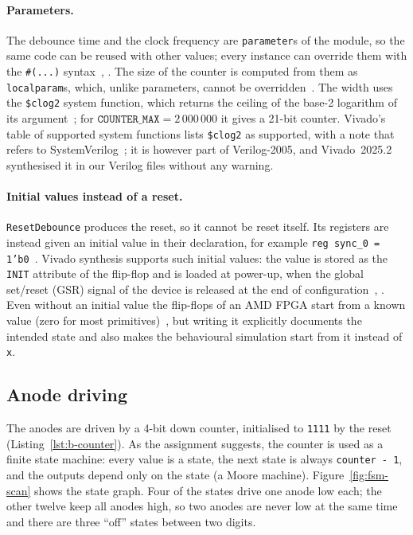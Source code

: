 \documentclass{article}
\begin{document}


\paragraph{Parameters.}
The debounce time and the clock frequency are \texttt{parameter}s of the module,
so the same code can be reused with other values; every instance can override them
with the \texttt{\#(...)} syntax~\cite[Sec.~12.2]{ieee1364}, \cite[Verilog Parameters]{ug901}.
The size of the counter is computed from them as \texttt{localparam}s, which,
unlike parameters, cannot be overridden~\cite[Sec.~4.10.2]{ieee1364}. The width
uses the \texttt{\$clog2} system function, which returns the ceiling of the
base-2 logarithm of its argument~\cite[Sec.~17.11.1]{ieee1364}; for
$\texttt{COUNTER\_MAX} = 2\,000\,000$ it gives a 21-bit counter. Vivado's table of
supported system functions lists \texttt{\$clog2} as supported, with a note
that refers to SystemVerilog~\cite[Table~24: System Tasks and Status]{ug901}; it is
however part of Verilog-2005, and Vivado~2025.2 synthesised it in our Verilog
files without any warning.

\paragraph{Initial values instead of a reset.}
\texttt{ResetDebounce} produces the reset, so it cannot be reset itself. Its
registers are instead given an initial value in their declaration, for example
\texttt{reg sync\_0 = 1'b0}~\cite[Sec.~6.2.1]{ieee1364}. Vivado synthesis
supports such initial values: the value is stored as the \texttt{INIT} attribute
of the flip-flop and is loaded at power-up, when the global set/reset (GSR)
signal of the device is released at the end of
configuration~\cite[Initial Values]{ug901}, \cite[When and Where to Use a Reset]{ug949}.
Even without an initial value the flip-flops of an AMD FPGA start from a known
value (zero for most primitives)~\cite[When and Where to Use a Reset]{ug949}, but
writing it explicitly documents the intended state and also makes the behavioural
simulation start from it instead of \texttt{x}.

\subsection{Anode driving}
The anodes are driven by a 4-bit down counter, initialised to \texttt{1111} by
the reset (Listing~\ref{lst:b-counter}). As the assignment suggests, the counter
is used as a finite state machine: every value is a state, the next state is
always \texttt{counter - 1}, and the outputs depend only on the state (a Moore
machine). Figure~\ref{fig:fsm-scan} shows the state graph. Four of the states
drive one anode low each; the other twelve keep all anodes high, so two anodes
are never low at the same time and there are three \enquote{off} states between
two digits.
\end{document}
